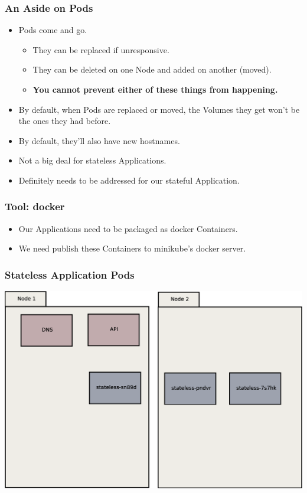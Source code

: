 \documentclass{beamer}
\begin{document}
\begin{frame}
    \frametitle{An Aside on Pods}
    \begin{itemize}
        \item Pods come and go.
        \begin{itemize}
            \item They can be replaced if unresponsive.
            \item They can be deleted on one Node and added on another (moved).
            \item \textbf{You cannot prevent either of these things from happening.}
        \end{itemize}
        \item By default, when Pods are replaced or moved, the Volumes they get won't be the ones they had before.
        \item By default, they'll also have new hostnames.
        \item Not a big deal for stateless Applications.
        \item Definitely needs to be addressed for our stateful Application.
    \end{itemize}
\end{frame}

\begin{frame}
    \frametitle{Tool: docker\footnotemark}
    \begin{itemize}
        \item Our Applications need to be packaged as docker Containers.
        \item We need publish these Containers to minikube's docker server.
    \end{itemize}
\end{frame}

\begin{frame}
    \frametitle{Stateless Application Pods}
    \includegraphics[width=\textwidth,height=0.85\textheight,keepaspectratio]{graphics/02-statelessAppPods.eps}
\end{frame}
\end{document}
